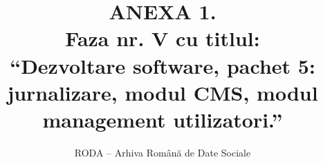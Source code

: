 \documentclass[11pt,twoside,romanian]{extbook}
\begin{document}
\fancyhead[RE,LO]{\thepage}


\title{ANEXA 1.\\
Faza nr. V 
cu titlul:\\
``Dezvoltare software, pachet 5: jurnalizare, modul CMS, modul management utilizatori.''
}

\author{RODA -- Arhiva Rom\^{a}n\u{a} de Date Sociale}

\date{ }

\maketitle

\newpage
\thispagestyle{plain}
\tableofcontents{}
\setcounter{page}{1}

\begin{comment}
\chapter{Modulul de management de continut (CMS)}

\section{Front-end CMS}











 



\chapter{Modulul de management al utilizatorilor}


\chapter{Sistemul de jurnalizare}




\end{comment}
\end{document}
